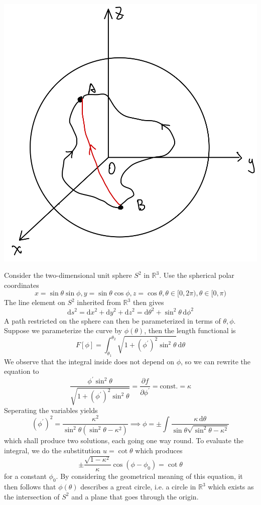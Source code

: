 \documentclass{article}
\begin{document}
\begin{example}\ 
    \begin{center}
        \includegraphics[scale=0.13]{geodesics_sphere.jpeg}
    \end{center}
    Consider the two-dimensional unit sphere $S^2$ in $\mathbb R^3$.
    Use the spherical polar coordinates
    $$x=\sin\theta\sin\phi,y=\sin\theta\cos\phi,z=\cos\theta,\theta\in [0,2\pi),\theta\in[0,\pi)$$
    The line element on $S^2$ inherited from $\mathbb R^3$ then gives
    $$\mathrm ds^2=\mathrm dx^2+\mathrm dy^2+\mathrm dz^2=\mathrm d\theta^2+\sin^2\theta\,\mathrm d\phi^2$$
    A path restricted on the sphere can then be parameterized in terms of $\theta,\phi$.
    Suppose we parameterize the curve by $\phi(\theta)$, then the length functional is
    $$F[\phi]=\int_{\theta_1}^{\theta_2}\sqrt{1+(\phi^\prime)^2\sin^2\theta}\,\mathrm d\theta$$
    We observe that the integral inside does not depend on $\phi$, so we can rewrite the equation to
    $$\frac{\phi^\prime\sin^2\theta}{\sqrt{1+(\phi^\prime)^2\sin^2\theta}}=\frac{\partial f}{\partial \phi^\prime}=\text{const.}=\kappa$$
    Seperating the variables yields
    $$(\phi^\prime)^2=\frac{\kappa^2}{\sin^2\theta(\sin^2\theta-\kappa^2)}\implies\phi=\pm\int\frac{\kappa\,\mathrm d\theta}{\sin\theta\sqrt{\sin^2\theta-\kappa^2}}$$
    which shall produce two solutions, each going one way round.
    To evaluate the integral, we do the substitution $u=\cot\theta$ which produces
    $$\pm\frac{\sqrt{1-\kappa^2}}{\kappa}\cos(\phi-\phi_0)=\cot\theta$$
    for a constant $\phi_0$.
    By considering the geometrical meaning of this equation, it then follows that $\phi(\theta)$ describes a great circle, i.e. a circle in $\mathbb R^3$ which exists as the intersection of $S^2$ and a plane that goes through the origin.
\end{example}
\end{document}
